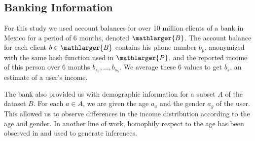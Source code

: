 \subsection{Banking Information}


For this study we used account balances for over 10 million clients of a bank in Mexico for a period of 6 months, denoted \( \mathlarger{B} \). 
The account balance for each client \( b \in \mathlarger{B} \) contains his phone number \( b_p \), anonymized with the same hash function used in \( \mathlarger{P} \), and the reported income of this person over 6 months \( b_{s_0}, \ldots, b_{s_5} \). We average these 6 values to get \( b_s \), an estimate of a user's income.

The bank also provided us with demographic information for a subset \( A \) of the dataset \( B \). For each \( a \in A \), we are given  the age \( a_a \) and the gender \( a_g \) of the user. This allowed us to observe differences in the income distribution according to the age and gender. In another line of work, homophily respect to the age has been observed in \cite{brea2014} and used to generate inferences.
